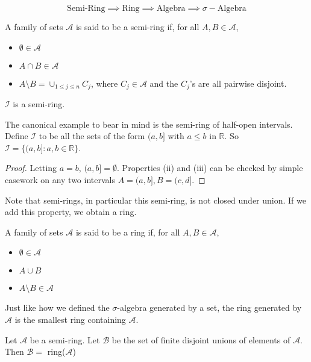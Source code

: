  \[ \text{Semi-Ring} \implies \text{Ring} \implies \text{Algebra} \implies \sigma-\text{Algebra} \]

 \begin{definition}
    A family of sets $\mathcal A$ is said to be a semi-ring if, for all 
    $A, B \in \mathcal A$,
    \begin{itemize}
        \item $\emptyset \in \mathcal A$
        \item $A \cap B \in \mathcal A$
        \item $A \setminus B = \cup_{1 \leq j \leq n}C_j$, where $C_j \in \mathcal A$ and the $C_j$'s 
         are all pairwise disjoint.
    \end{itemize}
 \end{definition}

 \begin{Proposition}
   $\mathcal I$ is a semi-ring.
 \end{Proposition}

 The canonical example to bear in mind is the semi-ring of half-open intervals. Define 
 $\mathcal I$ to be all the sets of the form $(a,b]$ with $a \leq b$ in $\mathbb R$. So 
 $\mathcal I = \{(a,b] : a,b \in \mathbb R\}$.

 \begin{proof}
   Letting $a = b$, $(a,b] = \emptyset$. Properties (ii) and (iii) can be checked by simple 
   casework on any two intervals $A = (a,b], B = (c,d]$.
 \end{proof}

 Note that semi-rings, in particular this semi-ring, 
 is not closed under union. If we add this property, we obtain a ring. 

 \begin{definition}[Ring]
   A family of sets $\mathcal A$ is said to be a ring if, for all 
   $A, B \in \mathcal A$,
   \begin{itemize}
       \item $\emptyset \in \mathcal A$
       \item $A \cup B$
       \item $A \setminus B \in \mathcal A$
   \end{itemize}
\end{definition}

Just like how we defined the $\sigma$-algebra generated by a set, the ring generated 
by $\mathcal A$ is the smallest ring containing $\mathcal A$.

\begin{Proposition}\label{prop:make_ring}
   Let $\mathcal A$ be a semi-ring. Let $\mathcal B$ be the set of finite disjoint unions 
   of elements of $\mathcal A$. Then $\mathcal B = $ ring($\mathcal A$)
\end{Proposition}


